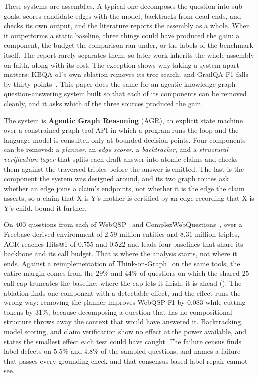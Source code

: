 These systems are assemblies. A typical one decomposes the question into
sub-goals, scores candidate edges with the model, backtracks from dead
ends, and checks its own output, and the literature reports the assembly
as a whole. When it outperforms a static baseline, three things could
have produced the gain: a component, the budget the comparison ran
under, or the labels of the benchmark itself. The report rarely
separates them, so later work inherits the whole assembly on faith,
along with its cost. The exception shows why taking a system apart
matters: KBQA-o1's own ablation removes its tree search, and GrailQA F1
falls by thirty points~\cite{luo2025kbqao1}. This paper does the same
for an agentic knowledge-graph question-answering system built so that
each of its components can be removed cleanly, and it asks which of the
three sources produced the gain.

The system is \textbf{Agentic Graph Reasoning} (AGR), an explicit state
machine over a constrained graph tool API in which a program runs the
loop and the language model is consulted only at bounded decision
points. Four components can be removed: a \emph{planner}, an \emph{edge
scorer}, a \emph{backtracker}, and a \emph{structural verification
layer} that splits each draft answer into atomic claims and checks them
against the traversed triples before the answer is emitted. The last is
the component the system was designed around, and its two graph routes
ask whether an edge joins a claim's endpoints, not whether it is the
edge the claim asserts, so a claim that X is Y's mother is certified by
an edge recording that X is Y's child.
 bound it further.

On $400$ questions from each of WebQSP~\cite{yih2016value} and
ComplexWebQuestions~\cite{talmor2018web}, over a Freebase-derived
environment of $2.59$ million entities and $8.31$ million triples, AGR
reaches Hits@1 of $0.755$ and $0.522$ and leads four baselines that
share its backbone and its call budget. That is where the analysis
starts, not where it ends. Against a reimplementation of
Think-on-Graph~\cite{sun2024think} on the same tools, the entire margin
comes from the $29\%$ and $44\%$ of questions on which the shared
$25$-call cap truncates the baseline; where the cap lets it finish, it
is ahead (). The ablation finds one component with a
detectable effect, and the effect runs the wrong way: removing the
planner improves WebQSP F1 by $0.083$ while cutting tokens by $31\%$,
because decomposing a question that has no compositional structure
throws away the context that would have answered it. Backtracking, model
scoring, and claim verification show no effect at the power available,
and  states the smallest effect each test could have
caught. The failure census finds label defects on $5.5\%$ and $4.8\%$ of
the sampled questions, and names a failure that passes every grounding
check and that consensus-based label repair cannot see.
